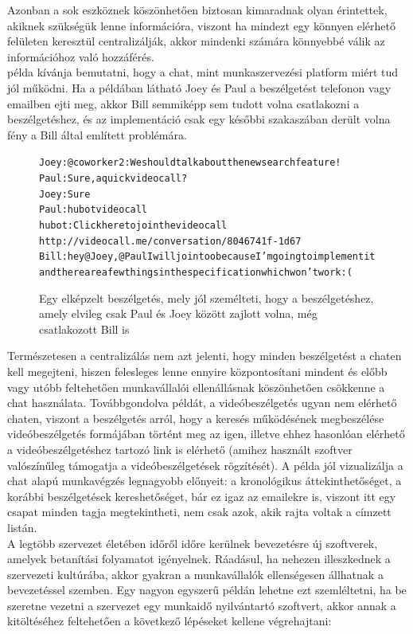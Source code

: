 Azonban a sok eszköznek köszönhetően biztosan kimaradnak olyan érintettek, akiknek szükségük lenne információra, viszont ha mindezt egy könnyen elérhető felületen keresztül centralizálják, akkor mindenki számára könnyebbé válik az információhoz való hozzáférés.\\
 példa kívánja bemutatni, hogy a chat, mint munkaszervezési platform miért tud jól működni. Ha a példában látható Joey és Paul a beszélgetést telefonon vagy emailben ejti meg, akkor Bill semmiképp sem tudott volna csatlakozni a beszélgetéshez, és az implementáció csak egy későbbi szakaszában derült volna fény a Bill által említett problémára.

\begin{figure}
  \begin{alltt}
Joey: @coworker2: We should talk about the new search feature!
Paul: Sure, a quick videocall?
Joey: Sure
Paul: hubot videocall
hubot: Click here to join the video call
       http://videocall.me/conversation/8046741f-1d67
Bill: hey @Joey, @Paul I will join too because I'm going to implement it 
      and there are a few things in the specification which won't work :(
  \end{alltt}
  \caption[DUMMY]%
    {Egy elképzelt beszélgetés, mely jól személteti, hogy a beszélgetéshez, amely elvileg csak Paul és Joey között zajlott volna, még csatlakozott Bill is}%
    \label{lst:search_feature_call}
\end{figure}

Természetesen a centralizálás nem azt jelenti, hogy minden beszélgetést a chaten kell megejteni, hiszen felesleges lenne ennyire központosítani mindent és előbb vagy utóbb feltehetően munkavállalói ellenállásnak köszönhetően csökkenne a chat használata. Továbbgondolva  példát, a videóbeszélgetés ugyan nem elérhető chaten, viszont a beszélgetés arról, hogy a keresés működésének megbeszélése videóbeszélgetés formájában történt meg az igen, illetve ehhez hasonlóan elérhető a videóbeszélgetéshez tartozó link is elérhető (amihez használt szoftver valószínűleg támogatja a videóbeszélgetések rögzítését). A példa jól vizualizálja a chat alapú munkavégzés legnagyobb előnyeit: a kronológikus áttekinthetőséget, a korábbi beszélgetések kereshetőséget, bár ez igaz az emailekre is, viszont itt egy csapat minden tagja megtekintheti, nem csak azok, akik rajta voltak a címzett listán.\\

A legtöbb szervezet életében időről időre kerülnek bevezetésre új szoftverek, amelyek betanítási folyamatot igényelnek. Ráadásul, ha nehezen illeszkednek a szervezeti kultúrába, akkor gyakran a munkavállalók ellenségesen állhatnak a bevezetéssel szemben. Egy nagyon egyszerű példán lehetne ezt szemléltetni, ha be szeretne vezetni a szervezet egy munkaidő nyilvántartó szoftvert, akkor annak a kitöltéséhez feltehetően a következő lépéseket kellene végrehajtani:

